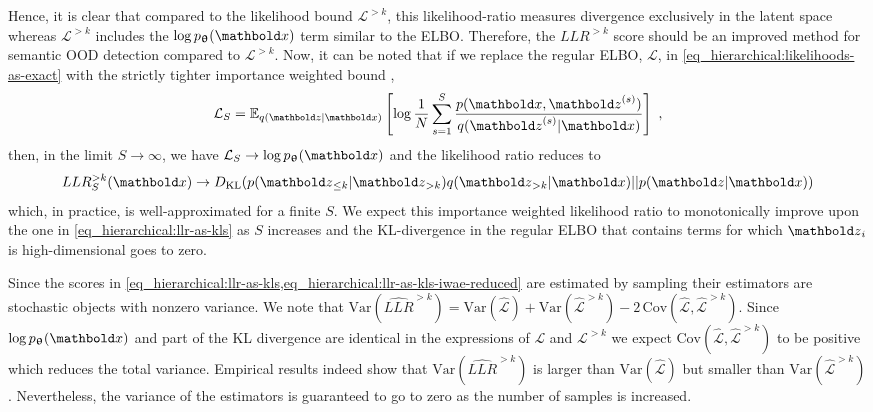 {Hence, it is clear that compared to the likelihood bound $\mathcal{L}^{>k}$, this likelihood-ratio measures divergence exclusively in the latent space whereas $\mathcal{L}^{>k}$ includes the $\log p_\thetab(\xb)$ term similar to the ELBO.
Therefore, the $LLR^{>k}$ score should be an improved method for semantic OOD detection compared to $\mathcal{L}^{>k}$.
Now, it can be noted that if we replace the regular ELBO, $\mathcal{L}$, in \cref{eq_hierarchical:likelihoods-as-exact} with the strictly tighter importance weighted bound \cite{burda_importance_2016},
\begin{equation}
    \mathcal{L}_{S} = \mathbb{E}_{q(\zb|\xb)}\left[ \log \frac{1}{N} \sum_{s=1}^{S} \frac{p(\xb, \zb^{(s)})}{q(\zb^{(s)}|\xb)} \right] \ , \label{eq_hierarchical:iw-bound}
\end{equation}
then, in the limit $S\rightarrow\infty$, we have $\mathcal{L}_{S} \rightarrow \log p_\thetab(\xb)$ and the likelihood ratio reduces to
\begin{equation}
    LLR^{>k}_{S}(\xb) \rightarrow D_{\mathrm{KL}}( p(\zb_{\leq k}|\zb_{>k}) q(\zb_{>k}|\xb) || p(\zb|\xb))
\end{equation}\label{eq_hierarchical:llr-as-kls-iwae-reduced}
which, in practice, is well-approximated for a finite $S$. We expect this importance weighted likelihood ratio to monotonically improve upon the one in \cref{eq_hierarchical:llr-as-kls} as $S$ increases and the KL-divergence in the regular ELBO that contains terms for which $\zb_i$ is high-dimensional goes to zero.


Since the scores in \cref{eq_hierarchical:llr-as-kls,eq_hierarchical:llr-as-kls-iwae-reduced} are estimated by sampling their estimators are stochastic objects with nonzero variance.
We note that $\text{Var}(\widehat{LLR}^{>k}) = \text{Var}(\hat{\mathcal{L}}) + \text{Var}(\hat{\mathcal{L}}^{>k}) - 2\, \text{Cov}(\hat{\mathcal{L}}, \hat{\mathcal{L}}^{>k})$.
Since $\log p_\thetab(\xb)$ and part of the KL divergence are identical in the expressions of $\mathcal{L}$ and $\mathcal{L}^{>k}$ we expect $\text{Cov}(\hat{\mathcal{L}}, \hat{\mathcal{L}}^{>k})$ to be positive which reduces the total variance. 
Empirical results indeed show that $\text{Var}(\widehat{LLR}^{>k})$ is larger than $\text{Var}(\hat{\mathcal{L}})$ but smaller than $\text{Var}(\hat{\mathcal{L}}^{>k})$.
Nevertheless, the variance of the estimators is guaranteed to go to zero as the number of samples is increased.

}
